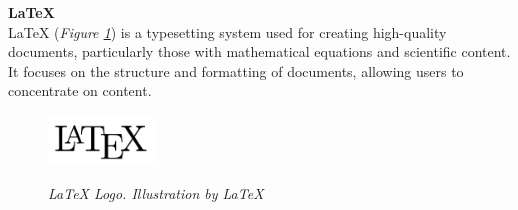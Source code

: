 \vspace{0.5cm}
\textbf{LaTeX} \\

LaTeX (\textit{Figure \ref{fig:latex-logo}}) is a typesetting system used for creating high-quality documents, particularly those with mathematical equations and scientific content. It focuses on the structure and formatting of documents, allowing users to concentrate on content.

\begin{figure}[H]
\centering
\begin{adjustbox}{trim=0cm 0cm, clip}
\includegraphics[width=0.25\textwidth]{imatges/studies_and_decisions/latex-logo.png}
\end{adjustbox}
\caption[LaTeX Logo]{\textit{LaTeX Logo. Illustration by LaTeX}}
{\label{fig:latex-logo}}
\end{figure}


